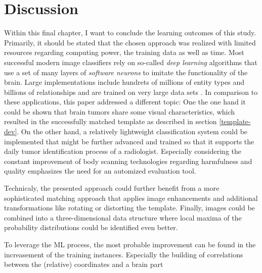 \documentclass[twoside,11pt]{article}
\begin{document}
\section{Discussion}
	Within this final chapter, I want to conclude the learning outcomes of this study. Primarily, it should be stated that the chosen approach was realized with limited resources regarding computing power, the training data as well as time. Most successful modern image classifiers rely on so-called \textit{deep learning} algorithms that use a set of many layers of \textit{software neurons} to imitate the functionality of the brain. Large implementations include hundrets of millions of entity types and billions of relationships and are trained on very large data sets \citep{deepLearning}. In comparison to these applications, this paper addressed a different topic: One the one hand it could be shown that brain tumors share some visual characteristics, which resulted in the successfully matched template as described in section \ref{template-dev}. On the other hand, a relatively lightweight classification system could be implemented that might be further advanced and trained so that it supports the daily tumor identification process of a radiologist. Especially considering the constant improvement of body scanning technologies regarding harmfulness and quality emphasizes the need for an automized evaluation tool. 
	
	Technicaly, the presented approach could further benefit from a more sophisticated matching approach that applies image enhancements and additional transformations like rotating or distorting the template. Finally, images could be combined into a three-dimensional data structure where local maxima of the probability distributions could be identified even better.
	
	To leverage the ML process, the most probable improvement can be found in the increasement of the training instances. Especially the building of correlations between the (relative) coordinates and a brain part 

\end{document}
